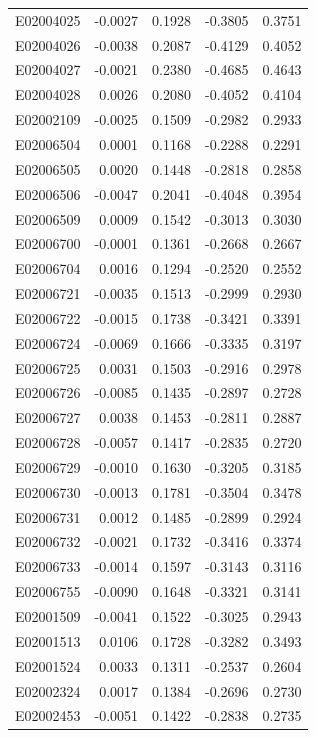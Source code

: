 \documentclass[11pt, a4paper]{article}
\begin{document}
\begin{longtable}{lrrrr}
E02004025 & -0.0027 & 0.1928 & -0.3805 & 0.3751 \\
E02004026 & -0.0038 & 0.2087 & -0.4129 & 0.4052 \\
E02004027 & -0.0021 & 0.2380 & -0.4685 & 0.4643 \\
E02004028 & 0.0026 & 0.2080 & -0.4052 & 0.4104 \\
E02002109 & -0.0025 & 0.1509 & -0.2982 & 0.2933 \\
E02006504 & 0.0001 & 0.1168 & -0.2288 & 0.2291 \\
E02006505 & 0.0020 & 0.1448 & -0.2818 & 0.2858 \\
E02006506 & -0.0047 & 0.2041 & -0.4048 & 0.3954 \\
E02006509 & 0.0009 & 0.1542 & -0.3013 & 0.3030 \\
E02006700 & -0.0001 & 0.1361 & -0.2668 & 0.2667 \\
E02006704 & 0.0016 & 0.1294 & -0.2520 & 0.2552 \\
E02006721 & -0.0035 & 0.1513 & -0.2999 & 0.2930 \\
E02006722 & -0.0015 & 0.1738 & -0.3421 & 0.3391 \\
E02006724 & -0.0069 & 0.1666 & -0.3335 & 0.3197 \\
E02006725 & 0.0031 & 0.1503 & -0.2916 & 0.2978 \\
E02006726 & -0.0085 & 0.1435 & -0.2897 & 0.2728 \\
E02006727 & 0.0038 & 0.1453 & -0.2811 & 0.2887 \\
E02006728 & -0.0057 & 0.1417 & -0.2835 & 0.2720 \\
E02006729 & -0.0010 & 0.1630 & -0.3205 & 0.3185 \\
E02006730 & -0.0013 & 0.1781 & -0.3504 & 0.3478 \\
E02006731 & 0.0012 & 0.1485 & -0.2899 & 0.2924 \\
E02006732 & -0.0021 & 0.1732 & -0.3416 & 0.3374 \\
E02006733 & -0.0014 & 0.1597 & -0.3143 & 0.3116 \\
E02006755 & -0.0090 & 0.1648 & -0.3321 & 0.3141 \\
E02001509 & -0.0041 & 0.1522 & -0.3025 & 0.2943 \\
E02001513 & 0.0106 & 0.1728 & -0.3282 & 0.3493 \\
E02001524 & 0.0033 & 0.1311 & -0.2537 & 0.2604 \\
E02002324 & 0.0017 & 0.1384 & -0.2696 & 0.2730 \\
E02002453 & -0.0051 & 0.1422 & -0.2838 & 0.2735 \\

\end{longtable}
\end{document}
